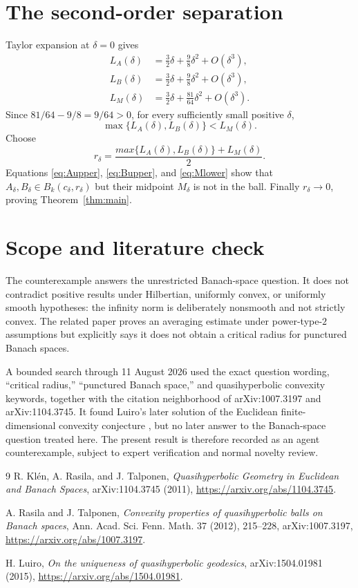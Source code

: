 \documentclass[11pt]{article}
\begin{document}
\section{The second-order separation}

Taylor expansion at $\delta=0$ gives
\begin{align*}
 L_A(\delta)
 &=\frac32\delta+\frac98\delta^2+O(\delta^3),\\
 L_B(\delta)
 &=\frac32\delta+\frac98\delta^2+O(\delta^3),\\
 L_M(\delta)
 &=\frac32\delta+\frac{81}{64}\delta^2+O(\delta^3).
\end{align*}
Since $81/64-9/8=9/64>0$, for every sufficiently small positive $\delta$,
\[
 \max\{L_A(\delta),L_B(\delta)\}<L_M(\delta).
\]
Choose
\[
 r_\delta=\frac{max\{L_A(\delta),L_B(\delta)\}+L_M(\delta)}2.
\]
Equations \eqref{eq:Aupper}, \eqref{eq:Bupper}, and \eqref{eq:Mlower} show
that $A_\delta,B_\delta\in B_k(c_\delta,r_\delta)$ but their midpoint
$M_\delta$ is not in the ball. Finally $r_\delta\to0$, proving
Theorem~\ref{thm:main}.

\section{Scope and literature check}

The counterexample answers the unrestricted Banach-space question. It does
not contradict positive results under Hilbertian, uniformly convex, or
uniformly smooth hypotheses: the infinity norm is deliberately nonsmooth and
not strictly convex.  The related paper \cite{RT} proves an averaging estimate
under power-type-$2$ assumptions but explicitly says it does not obtain a
critical radius for punctured Banach spaces.

A bounded search through 11 August 2026 used the exact question wording,
``critical radius,'' ``punctured Banach space,'' and quasihyperbolic
convexity keywords, together with the citation neighborhood of
arXiv:1007.3197 and arXiv:1104.3745. It found Luiro's later solution of the
Euclidean finite-dimensional convexity conjecture \cite{Luiro}, but no later
answer to the Banach-space question treated here. The present result is
therefore recorded as an agent counterexample, subject to expert verification
and normal novelty review.

\begin{thebibliography}{9}
R. Kl\'en, A. Rasila, and J. Talponen,
\emph{Quasihyperbolic Geometry in Euclidean and Banach Spaces},
arXiv:1104.3745 (2011),
\url{https://arxiv.org/abs/1104.3745}.

A. Rasila and J. Talponen,
\emph{Convexity properties of quasihyperbolic balls on Banach spaces},
Ann. Acad. Sci. Fenn. Math. 37 (2012), 215--228,
arXiv:1007.3197,
\url{https://arxiv.org/abs/1007.3197}.

H. Luiro,
\emph{On the uniqueness of quasihyperbolic geodesics},
arXiv:1504.01981 (2015),
\url{https://arxiv.org/abs/1504.01981}.
\end{thebibliography}
\end{document}
